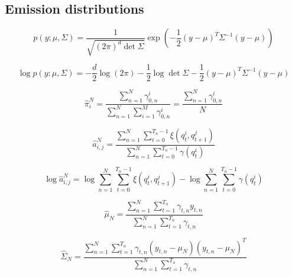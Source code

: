 \documentclass[a4paper, 11pt]{article}
\begin{document}
\subsection{Emission distributions}

\begin{displaymath}
  p(y ; \mu, \Sigma) = \dfrac{1}{\sqrt{(2 \pi)^d \det{\Sigma}}}
  \exp{
    \left(
    -\dfrac{1}{2}
      (y - \mu)^T \Sigma^{-1} (y - \mu)
    \right)
  }
\end{displaymath}

\begin{displaymath}
  \log{p(y ; \mu, \Sigma)} =
  - \dfrac{d}{2} \log(2 \pi)
  - \dfrac{1}{2} \log\det{\Sigma}
  - \dfrac{1}{2} (y - \mu)^T \Sigma^{-1} (y - \mu)
\end{displaymath}


\begin{displaymath}
  \hat{\pi}_i^N = \dfrac{
    \sum_{n=1}^N \gamma_{0,n}^i
  }{
     \sum_{n=1}^N \sum_{i=1}^M \gamma_{0,n}^i
  } = \dfrac{
    \sum_{n=1}^N \gamma_{0,n}^i
  }{
     N
  }
\end{displaymath}


\begin{displaymath}
  \hat{a}_{i,j}^N = \dfrac{
    \sum_{n=1}^N \sum_{t=0}^{T_n-1} \xi(q_t^i, q_{t+1}^j)
  }{
    \sum_{n=1}^N \sum_{t=0}^{T_n-1} \gamma(q_t^i)
  }
\end{displaymath}


\begin{displaymath}
  \log{\hat{a}_{i,j}^N}
  = \log{\sum_{n=1}^N \sum_{t=0}^{T_n-1} \xi(q_t^i, q_{t+1}^j)}
  - \log{\sum_{n=1}^N \sum_{t=0}^{T_n-1} \gamma(q_t^i)}
\end{displaymath}


\begin{displaymath}
  \hat{\mu}_N = \dfrac{
    \sum_{n=1}^N \sum_{t=1}^{T_n} \gamma_{t,n} y_{t,n}
  }{
    \sum_{n=1}^N \sum_{t=1}^{T_n} \gamma_{t,n}
  }
\end{displaymath}


\begin{displaymath}
  \hat{\Sigma}_N = \dfrac{
    \sum_{n=1}^N \sum_{t=1}^{T_n}
    \gamma_{t,n} \left( y_{t,n} - \mu_N \right) \left( y_{t,n} - \mu_N \right)^T
  }{
    \sum_{n=1}^N \sum_{t=1}^{T_n} \gamma_{t,n}
  }
\end{displaymath}





\newpage

\end{document}
